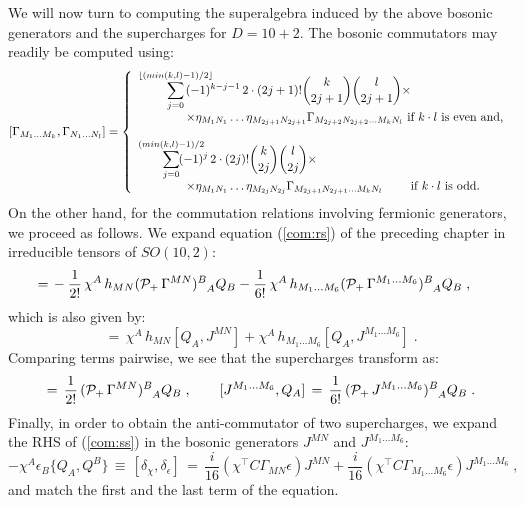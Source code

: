 \documentclass[a4paper,11pt]{article}
\def\G{{\Gamma}}
\def\E{{\eta}}
\begin{document}
We will now turn to computing the superalgebra induced by the above bosonic
generators and the supercharges for $D=10+2$. The bosonic commutators may readily be
computed using:
\begin{equation}\label{GamComm}
[\G_{M_{1}\ldots M_{k}},\G_{N_{1}\ldots N_{l}}]=\left\{
\begin{array}{l}\displaystyle{
\sum_{j=0}^{\lfloor (min(k,l)-1)/2\rfloor} \hspace{-.8cm}(-1)^{k-j-1}\,2\cdot (2j+1)! \binom{k}{2j+1} \binom{l}{2j+1}
\times}\\ 
\qquad\qquad\displaystyle{\times\E_{M_1 N_1}\ldots \E_{M_{2j+1} N_{2j+1}}\G_{M_{2j+2} N_{2j+2}\ldots M_{k} N_{l}}}
\text{ if $k\cdot l$ is even and,} \\ \\
\displaystyle{\sum_{j=0}^{(min(k,l)-1)/2} \hspace{-.75cm}(-1)^{j}\,2\cdot (2j)! \binom{k}{2j} \binom{l}{2j}\times}\\ 
\qquad\qquad\displaystyle{\times \E_{M_1 N_1}\ldots \E_{M_{2j} N_{2j}}\G_{M_{2j+1} N_{2j+1}\ldots M_{k} N_{l}}}\quad\quad \text{ if $k\cdot l$ is odd.}
\end{array}\right.
\end{equation} 
On the other hand,
for the commutation relations involving fermionic generators, we proceed as
follows. We expand equation (\ref{com:rs}) of the preceding chapter in irreducible tensors
of $SO(10,2)$:
\begin{align}
[\delta_{\chi},\delta_h]\,=&\,
-\frac{1}{2!}\,\chi^A\,h_{MN} ({\cal P_+}\,\Gamma^{MN})^B_{\phantom{B}A} Q_B-
\frac{1}{6!}\,\chi^A\,h_{M_1\ldots M_6} ({\cal P_+}\,\Gamma^{M_1\ldots M_6})^B_{\phantom{B}A} Q_B\;,\notag
\end{align}
which is also given by:
\begin{equation}
[\delta_{\chi},\delta_h]
\,=\,\chi^A\,h_{MN}[Q_A,J^{MN}]+\chi^A\,h_{M_1\ldots M_6}[Q_A,J^{M_1\ldots M_6}]\;.
\end{equation}
Comparing terms pairwise, we see that the supercharges transform as:
\begin{equation*}
[J^{MN},Q_A]\,=\,\frac{1}{2!}\, ({\cal P_+}\,\Gamma^{MN})^B_{\phantom{B}A} Q_B\;,\qquad
[J^{M_1\ldots M_6},Q_A]\,=\,\frac{1}{6!}\,({\cal P_+}\,J^{M_1\ldots M_6})^B_{\phantom{B}A} Q_B \;.
\end{equation*}
Finally, in order to obtain the anti-commutator of two supercharges, we expand the RHS of (\ref{com:ss}) in the 
bosonic generators $J^{MN}$ and $J^{M_1 \ldots M_6}$:
\begin{equation}
\label{QaQb} 
-\chi^A\epsilon_B \{Q_A,Q^B\}\,\equiv\,
[\delta_{\chi},\delta_{\epsilon}]\,=\,
\frac{i}{16} (\chi^{\top}C \Gamma_{MN}\epsilon) J^{MN}
+\frac{i}{16} (\chi^{\top}C \Gamma_{M_1\ldots M_6}\epsilon)
J^{M_1\ldots M_6}\;,
\end{equation}
and match the first and the last term of the equation.
\end{document}
